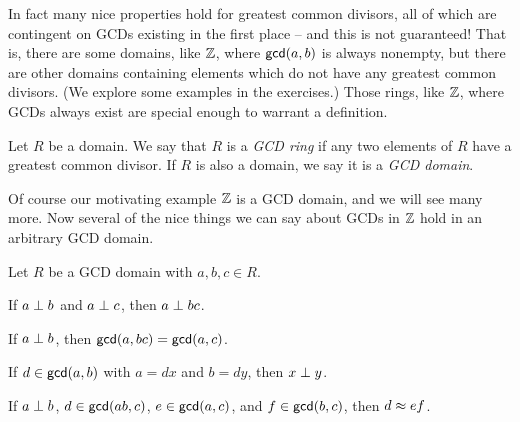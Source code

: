 In fact many nice properties hold for greatest common divisors, all of which are contingent on GCDs existing in the first place -- and this is not guaranteed! That is, there are some domains, like \(\mathbb{Z}\), where \(\mathsf{gcd}(a, b)\) is always nonempty, but there are other domains containing elements which do not have any greatest common divisors. (We explore some examples in the exercises.) Those rings, like \(\mathbb{Z}\), where GCDs always exist are special enough to warrant a definition.

\begin{dfn} \label{dfn:gcd-ring}
Let \(R\) be a domain. We say that \(R\) is a \emph{GCD ring} if any two elements of \(R\) have a greatest common divisor.  If $R$ is also a domain, we say it is a \emph{GCD domain}. 
\end{dfn}

Of course our motivating example \(\mathbb{Z}\) is a GCD domain, and we will see many more. Now several of the nice things we can say about GCDs in \(\mathbb{Z}\) hold in an arbitrary GCD domain.

\begin{prop} \label{prop:gcd-dom-basics}
Let \(R\) be a GCD domain with \(a,b,c \in R\).
\begin{proplist*}
\item If \(a \perp b\) and \(a \perp c\), then \(a \perp bc\).
\item If \(a \perp b\), then \(\mathsf{gcd}(a, bc) = \mathsf{gcd}(a, c)\). \label{prop:gcd-dom-basics:drop-factor}
\item If \(d \in \mathsf{gcd}(a, b)\) with \(a = dx\) and \(b = dy\), then \(x \perp y\).
\item If \(a \perp b\), \(d \in \mathsf{gcd}(ab, c)\), \(e \in \mathsf{gcd}(a, c)\), and \(f \in \mathsf{gcd}(b, c)\), then \(d \approx ef\).
\end{proplist*}
\end{prop}

